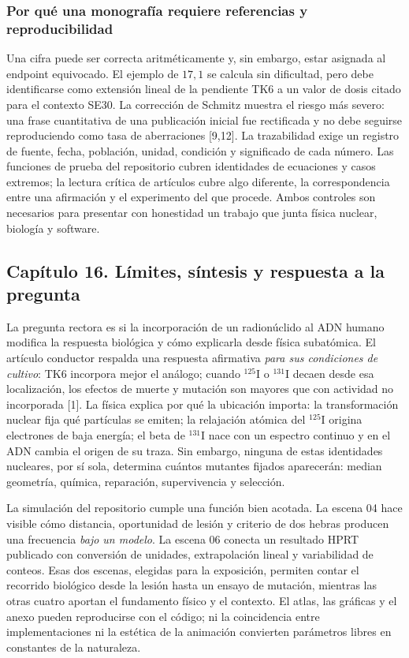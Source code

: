 \subsubsection{Por qué una monografía requiere referencias y reproducibilidad}
Una cifra puede ser correcta aritméticamente y, sin embargo, estar
asignada al endpoint equivocado. El ejemplo de $17,1$ se calcula
sin dificultad, pero debe identificarse como extensión lineal de la
pendiente TK6 a un valor de dosis citado para el contexto SE30.
La corrección de Schmitz muestra el riesgo más severo: una frase
cuantitativa de una publicación inicial fue rectificada y no debe
seguirse reproduciendo como tasa de aberraciones [9,12]. La
trazabilidad exige un registro de fuente, fecha, población, unidad,
condición y significado de cada número. Las funciones de prueba del
repositorio cubren identidades de ecuaciones y casos extremos; la
lectura crítica de artículos cubre algo diferente, la correspondencia
entre una afirmación y el experimento del que procede. Ambos controles
son necesarios para presentar con honestidad un trabajo que junta
física nuclear, biología y software.

\clearpage
\subsection{Capítulo 16. Límites, síntesis y respuesta a la pregunta}
\label{ampliacion-conclusiones}

La pregunta rectora es si la incorporación de un radionúclido al ADN humano
modifica la respuesta biológica y cómo explicarla desde física subatómica.
El artículo conductor respalda una respuesta afirmativa \emph{para sus
condiciones de cultivo}: TK6 incorpora mejor el análogo; cuando
$^{125}$I o $^{131}$I decaen desde esa localización, los efectos de
muerte y mutación son mayores que con actividad no incorporada [1].
La física explica por qué la ubicación importa: la transformación
nuclear fija qué partículas se emiten; la relajación atómica del $^{125}$I
origina electrones de baja energía; el beta de $^{131}$I nace con un
espectro continuo y en el ADN cambia el origen de su traza. Sin embargo,
ninguna de estas identidades nucleares, por sí sola, determina cuántos
mutantes fijados aparecerán: median geometría, química, reparación,
supervivencia y selección.

La simulación del repositorio cumple una función bien acotada. La escena
04 hace visible cómo distancia, oportunidad de lesión y criterio de dos
hebras producen una frecuencia \emph{bajo un modelo}. La escena 06 conecta
un resultado HPRT publicado con conversión de unidades, extrapolación
lineal y variabilidad de conteos. Esas dos escenas, elegidas para la
exposición, permiten contar el recorrido biológico desde la lesión hasta
un ensayo de mutación, mientras las otras cuatro aportan el fundamento
físico y el contexto. El atlas, las gráficas y el anexo pueden reproducirse
con el código; ni la coincidencia entre implementaciones ni la estética
de la animación convierten parámetros libres en constantes de la naturaleza.

